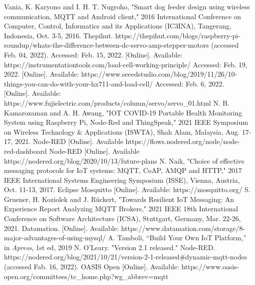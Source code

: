 \documentclass[conference]{IEEEtran}
\begin{document}
\begin{thebibliography}{00}
Vania, K. Karyono and I. H. T. Nugroho, "Smart dog feeder design using wireless communication, MQTT and Android client," 2016 International Conference on Computer, Control, Informatics and its Applications (IC3INA), Tangerang, Indonesia, Oct. 3-5, 2016.
Thepihut. https://thepihut.com/blogs/raspberry-pi-roundup/whats-the-difference-between-dc-servo-amp-stepper-motors (accessed Feb. 04, 2022).
Accessed: Feb. 15, 2022. [Online]. Available: https://instrumentationtools.com/load-cell-working-principle/
Accessed: Feb. 19, 2022. [Online]. Available: https://www.seeedstudio.com/blog/2019/11/26/10-things-you-can-do-with-your-hx711-and-load-cell/
Accessed: Feb. 6, 2022. [Online]. Available: https://www.fujielectric.com/products/column/servo/servo\_01.html
N. B. Kamarozaman and A. H. Awang, "IOT COVID-19 Portable Health Monitoring System using Raspberry Pi, Node-Red and ThingSpeak," 2021 IEEE Symposium on Wireless Technology \& Applications (ISWTA), Shah Alam, Malaysia, Aug. 17-17, 2021.
Node-RED [Online]. Available https://flows.nodered.org/node/node-red-dashboard
Node-RED [Online]. Available https://nodered.org/blog/2020/10/13/future-plans
N. Naik, "Choice of effective messaging protocols for IoT systems: MQTT, CoAP, AMQP and HTTP," 2017 IEEE International Systems Engineering Symposium (ISSE), Vienna, Austria, Oct. 11-13, 2017.
Eclipse Mosquitto [Online]. Available: https://mosquitto.org/
S. Gruener, H. Koziolek and J. Rückert, "Towards Resilient IoT Messaging: An Experience Report Analyzing MQTT Brokers," 2021 IEEE 18th International Conference on Software Architecture (ICSA), Stuttgart, Germany, Mar. 22-26, 2021.
Datamation. [Online]. Available: https://www.datamation.com/storage/8-major-advantages-of-using-mysql/
A. Tamboli, “Build Your Own IoT Platform,” in \textit{Apress}, 1st ed, 2019
N. O'Leary. "Version 2.1 released." Node-RED. https://nodered.org/blog/2021/10/21/version-2-1-released\#dynamic-mqtt-nodes (accessed Fab. 16, 2022).
OASIS Open [Online]. Available: https://www.oasis-open.org/committees/tc\_home.php?wg\_abbrev=mqtt

\end{thebibliography}
\vspace{12pt}
\end{document}
